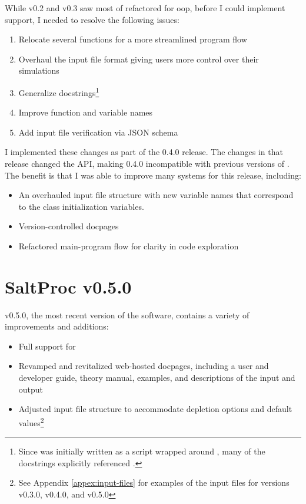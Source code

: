 While v0.2 and v0.3 saw most of \SaltProc refactored for \Gls{oop}, before I could
implement \OpenMC support, I needed to resolve the following issues:
\begin{enumerate}
    \item Relocate several functions for a more streamlined program flow
    \item Overhaul the \SaltProc input file format giving users more control over their simulations
    \item Generalize docstrings\footnote{Since \SaltProc was initially written as a script wrapped around \SerpentTWO, many of the docstrings explicitly referenced \SerpentTWO.}
    \item Improve function and variable names
    \item Add input file verification via JSON schema
\end{enumerate}
I implemented these changes as part of the 0.4.0 release. The changes in that
release changed the API, making 0.4.0 incompatible with previous versions of
\SaltProc. The benefit is that I was able to improve many systems for this
release, including:
\begin{itemize}
    \item An overhauled input file structure with new variable names that
    correspond to the class initialization variables.
    \item Version-controlled docpages
    \item Refactored main-program flow for clarity in code exploration
\end{itemize}

\section{SaltProc v0.5.0}
\label{sec:saltproc-detail}

\SaltProc v0.5.0, the most recent version of the software, contains a variety of
improvements and additions:
\begin{itemize}
    \item Full support for \OpenMC
    \item Revamped and revitalized web-hosted docpages, including a
    user and developer guide, theory manual, examples, and descriptions of
    the input and output
    \item Adjusted input file structure to accommodate \OpenMC depletion 
    options and default values\footnote{See Appendix \ref{appex:input-files}
    for examples of the input files for versions v0.3.0, v0.4.0, and v0.5.0}
\end{itemize}

